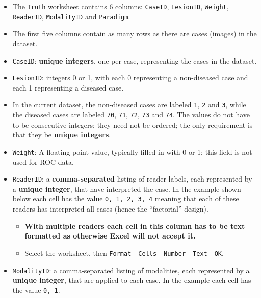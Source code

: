 \documentclass[
]{book}
\providecommand{\tightlist}{%
  \setlength{\itemsep}{0pt}\setlength{\parskip}{0pt}}
\begin{document}
\begin{itemize}
\tightlist
\item
  The \texttt{Truth} worksheet contains 6 columns: \texttt{CaseID}, \texttt{LesionID}, \texttt{Weight}, \texttt{ReaderID}, \texttt{ModalityID} and \texttt{Paradigm}.
\item
  The first five columns contain as many rows as there are cases (images) in the dataset.
\item
  \texttt{CaseID}: \textbf{unique integers}, one per case, representing the cases in the dataset.
\item
  \texttt{LesionID}: integers 0 or 1, with each 0 representing a non-diseased case and each 1 representing a diseased case.
\item
  In the current dataset, the non-diseased cases are labeled \texttt{1}, \texttt{2} and \texttt{3}, while the diseased cases are labeled \texttt{70}, \texttt{71}, \texttt{72}, \texttt{73} and \texttt{74}. The values do not have to be consecutive integers; they need not be ordered; the only requirement is that they be \textbf{unique integers}.
\item
  \texttt{Weight}: A floating point value, typically filled in with 0 or 1; this field is not used for ROC data.
\item
  \texttt{ReaderID}: a \textbf{comma-separated} listing of reader labels, each represented by a \textbf{unique integer}, that have interpreted the case. In the example shown below each cell has the value \texttt{0,\ 1,\ 2,\ 3,\ 4} meaning that each of these readers has interpreted all cases (hence the ``factorial'' design).

  \begin{itemize}
  \tightlist
  \item
    \textbf{With multiple readers each cell in this column has to be text formatted as otherwise Excel will not accept it.}
  \item
    Select the worksheet, then \texttt{Format} - \texttt{Cells} - \texttt{Number} - \texttt{Text} - \texttt{OK}.
  \end{itemize}
\item
  \texttt{ModalityID}: a comma-separated listing of modalities, each represented by a \textbf{unique integer}, that are applied to each case. In the example each cell has the value \texttt{0,\ 1}.


\end{itemize}
\end{document}
